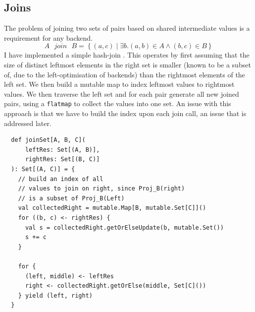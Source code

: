 \documentclass[12pt,a4paper,twoside,openright]{report}
\newcommand\codeName[1]{\texttt{#1}}
\newcommand{\setComp}[2]{\left\lbrace #1 \mid #2 \right\rbrace}
\renewcommand{\baselinestretch}{1.1}    %
\begin{document}
	\subsection{Joins}
	The problem of joining two sets of pairs based on shared intermediate values is a requirement for any backend. 
\[
A\mbox{ }join\mbox{ }B = \setComp{(a, c)}{\exists b. (a, b) \in A \wedge (b, c) \in B}
\]	
I have implemented a simple hash-join \cite{HashJoins}. This operates by first assuming that the size of distinct leftmost elements in the right set is smaller (known to be a subset of, due to the left-optimisation of backends) than the rightmost elements of the left set. We then build a mutable map to index leftmost values to rightmost values. We then traverse the left set and for each pair generate all new joined pairs, using a \codeName{flatmap} to collect the values into one set. An issue with this approach is that we have to build the index upon each join call, an issue that is addressed later.

\renewcommand{\baselinestretch}{0.8}
\begin{framed}
\begin{verbatim}
  def joinSet[A, B, C](
      leftRes: Set[(A, B)],
      rightRes: Set[(B, C)]
  ): Set[(A, C)] = {
    // build an index of all 
    // values to join on right, since Proj_B(right)
    // is a subset of Proj_B(Left)
    val collectedRight = mutable.Map[B, mutable.Set[C]]()
    for ((b, c) <- rightRes) {
      val s = collectedRight.getOrElseUpdate(b, mutable.Set())
      s += c
    }
    
    for {
      (left, middle) <- leftRes
      right <- collectedRight.getOrElse(middle, Set[C]())
    } yield (left, right)
  }
\end{verbatim}
\end{framed}
\renewcommand{\baselinestretch}{1.1}
\end{document}
